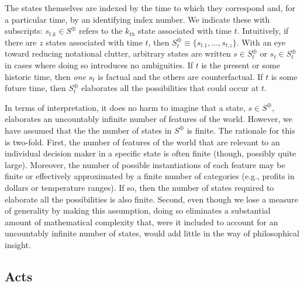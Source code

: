 \documentclass[
11pt,
titlepage,
reqno,
]{article}%
\theoremstyle{definition}
\begin{document}
The states themselves are indexed by the time to which they correspond and, for a particular time, by an identifying index number.
We indicate these with subscripts: $s_{t.k}\in S^\oplus$ refers to the $k_{th}$ state associated with time $t$.
Intuitively, if there are $z$ states associated with time $t$, then $S^\oplus_t\equiv\{s_{t.1},\dots,s_{t.z}\}$.
With an eye toward reducing notational clutter, arbitrary states are written $s\in S^\oplus_t$ or $s_t\in S^\oplus_t$ in cases where doing so introduces no ambiguities.
If $t$ is the present or some historic time, then \textit{one}  $s_t$ is factual and the others are counterfactual. 
If $t$ is some future time, then $S^\oplus_t$ elaborates all the possibilities that could occur at $t$.

In terms of interpretation, it does no harm to imagine that a state, $s\in S^\oplus$, elaborates an uncountably infinite number of features of the world.
However,  we have assumed that the the number of states in $S^\oplus$ is finite.
The rationale for this is two-fold.
First, the number of features of the world that are relevant to an individual decision maker in a specific state is often finite (though, possibly quite large).
Moreover, the number of possible instantiations of each feature may be finite or effectively approximated by a finite number of  categories (e.g., profits in dollars or temperature ranges).
If so, then the number of states required to elaborate all the possibilities is also finite.
Second, even  though we lose a measure of generality by making this assumption, doing so eliminates a substantial amount of mathematical complexity that, were it included to account for an uncountably infinite number of states, would add little in the way of philosophical insight.

	
	
	
\subsection{Acts}\label{sec:acts}
	
\end{document}
